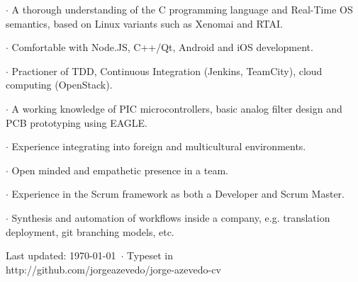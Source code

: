 {
 $\cdot$ A thorough understanding of the C programming language and Real-Time OS
semantics, based on Linux variants such as Xenomai and RTAI.

 $\cdot$ Comfortable with Node.JS, C++/Qt, Android and iOS development.

 $\cdot$ Practioner of TDD, Continuous Integration (Jenkins, TeamCity), cloud
computing (OpenStack).
}
{
 $\cdot$ A working knowledge of PIC microcontrollers, basic analog filter design and PCB
prototyping using EAGLE.
}
{
 $\cdot$ Experience integrating into foreign and multicultural environments.

 $\cdot$ Open minded and empathetic presence in a team.
}
{

 $\cdot$ Experience in the Scrum framework as both a Developer and Scrum
Master.

 $\cdot$ Synthesis and automation of workflows inside a company, e.g.
translation deployment, git branching models, etc.
}


\vfill

\begin{center}
{
    \scriptsize  Last updated: \today ~$\cdot$ Typeset in \XeLaTeX\\
    http://github.com/jorgeazevedo/jorge-azevedo-cv
}

\end{center}

